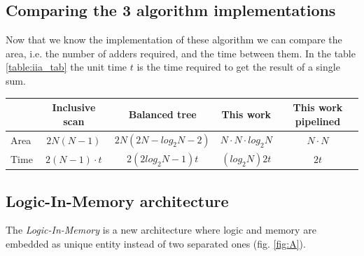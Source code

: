 \subsection{Comparing the 3 algorithm implementations}
Now that we know the implementation of these algorithm we can compare the area, i.e. the number of adders required, and the time between them.
In the table \ref{table:iia_tab} the unit time $ t $ is the time required to get the result of a single sum.


\begin{center}
	\begin{tabular}{ | p{1.7cm} | c | c | c | c |}
			
		\hline
		\label{table:iia_tab} & Inclusive scan & Balanced tree & This work & This work pipelined\\
		\hline
		Area & $ 2N(N-1) $ & $ 2N(2N-log_2 N -2) $ & $ N\cdotp N\cdotp log_2 N$ & $ N\cdotp N $\\
		\hline
		Time & $ 2(N-1) \cdotp t $
		& $ 2(2
		log_2 N-1)t $ &
		$ (log_2 N)2t $ & $ 2t $ \\
		\hline
		
	\end{tabular}
\end{center}
\subsection{Logic-In-Memory architecture} \label{sssec:1}
The \textit{Logic-In-Memory} is  a new architecture where logic and memory are embedded as unique entity instead of two separated ones (fig. \ref{fig:A}). \cite{lim}

